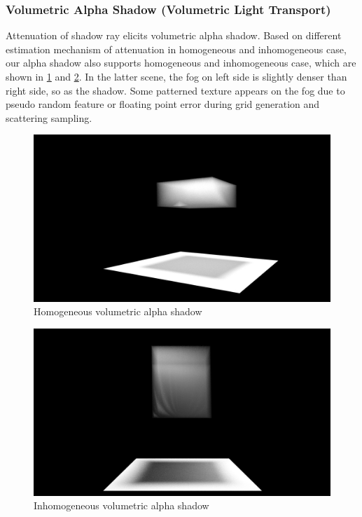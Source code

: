 \documentclass[acmtog]{acmart}
\begin{document}
\subsubsection{Volumetric Alpha Shadow (Volumetric Light Transport)}

Attenuation of shadow ray elicits volumetric alpha shadow. Based on different estimation mechanism of attenuation in homogeneous and inhomogeneous case, our alpha shadow also supports homogeneous and inhomogeneous case, which are shown in \ref{vol_alpha_homo} and \ref{vol_alpha_inhomo}. In the latter scene, the fog on left side is slightly denser than right side, so as the shadow. Some patterned texture appears on the fog due to pseudo random feature or floating point error during grid generation and scattering sampling.

\begin{figure}[h]
	\centering	
	\includegraphics[width=\linewidth]{vol_shadow_homo}
	\caption{Homogeneous volumetric alpha shadow}
	\label{vol_alpha_homo}
\end{figure}

\begin{figure}[h]
	\centering	
	\includegraphics[width=\linewidth]{vol_shadow_inhomo}
	\caption{Inhomogeneous volumetric alpha shadow}
	\label{vol_alpha_inhomo}
\end{figure}
\end{document}
